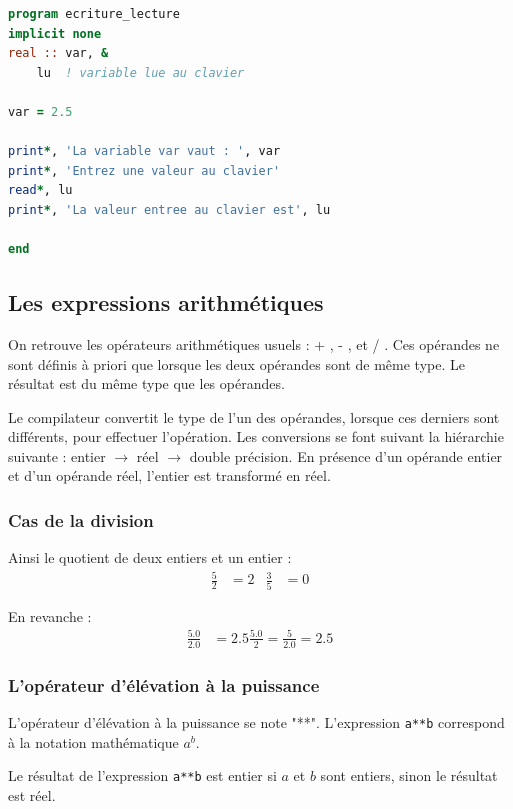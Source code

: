 \documentclass[a4paper,twoside]{article}
\begin{document}
\begin{lstlisting}[language=Fortran]
program ecriture_lecture
implicit none
real :: var, &
	lu	! variable lue au clavier

var = 2.5

print*, 'La variable var vaut : ', var
print*, 'Entrez une valeur au clavier'
read*, lu
print*, 'La valeur entree au clavier est', lu

end
\end{lstlisting}

\subsection{Les expressions arithmétiques}
On retrouve les opérateurs arithmétiques usuels : \og + \fg, \og - \fg, \og * \fg et \og / \fg. Ces opérandes ne sont définis à priori que lorsque les deux opérandes sont de même type. Le résultat est du même type que les opérandes. 

Le compilateur convertit le type de l'un des opérandes, lorsque ces derniers sont différents, pour effectuer l'opération. Les conversions se font suivant la hiérarchie suivante : entier $\rightarrow$ réel $\rightarrow$ double précision. En présence d'un opérande entier et d'un opérande réel, l'entier est transformé en réel. 

\subsubsection{Cas de la division}
Ainsi le quotient de deux entiers et un entier : 
\begin{align}
\frac{5}{2} &= 2 & \frac{3}{5} &= 0
\end{align}

En revanche :
\begin{align}
\frac{5.0}{2.0} &= 2.5 \frac{5.0}{2} = \frac{5}{2.0} = 2.5
\end{align}

\subsubsection{L'opérateur d'élévation à la puissance}

L'opérateur d'élévation à la puissance se note "**". L'expression \texttt{a**b} correspond à la notation mathé\-ma\-tique $a^{b}$. 

Le résultat de l'expression \texttt{a**b} est entier si $a$ et $b$ sont entiers, sinon le résultat est réel.
\end{document}

